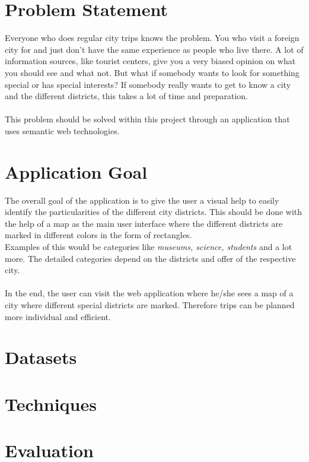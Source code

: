 \section{Problem Statement}
Everyone who does regular city trips knows the problem. You who visit a foreign city for and just don’t have the same experience as people who live there.  A lot of information sources, like tourist centers, give you a very biased opinion on what you should see and what not. But what if somebody wants to look for something special or has special interests? If somebody really wants to get to know a city and the different districts,  this takes a lot of time and preparation.
\\ \\
This problem should be solved within this project through an application that uses semantic web technologies.

\section{Application Goal}
The overall goal of the application is to give the user a visual help to easily identify the particularities of the different city districts. This should be done with the help of a map as the main user interface where the different districts are marked in different colors in the form of rectangles.
\\
Examples of this would be categories like \textit{museums, science, students} and a lot more. The detailed categories depend on the districts and offer of the respective city. 
\\ \\
In the end, the user can visit the web application where he/she sees a map of a city where different special districts are marked. Therefore trips can be planned more individual and efficient.

\section{Datasets}

\section{Techniques}

\section{Evaluation}


